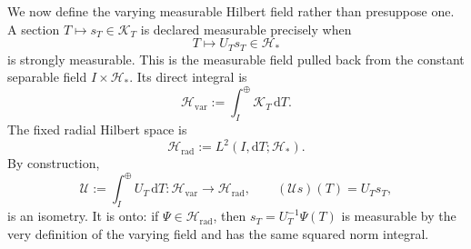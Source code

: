 We now define the varying measurable Hilbert field rather than presuppose
one.  A section \(T\mapsto s_T\in\mathscr K_T\) is declared measurable
precisely when
\[
 T\longmapsto U_Ts_T\in\mathscr H_*
\]
is strongly measurable.  This is the measurable field pulled back from the
constant separable field \(I\times\mathscr H_*\).  Its direct integral is
\[
 \mathscr H_{\mathrm{var}}
 :=\int_I^\oplus\mathscr K_T\,\mathrm d T.
\]
The fixed radial Hilbert space is
\[
 \mathscr H_{\mathrm{rad}}
 :=L^2(I,\mathrm d T;\mathscr H_*).
\]
By construction,
\begin{equation}
 \mathscr U:=\int_I^\oplus U_T\,\mathrm d T:
 \mathscr H_{\mathrm{var}}\longrightarrow\mathscr H_{\mathrm{rad}},
 \qquad
 (\mathscr Us)(T)=U_Ts_T,
\label{native-di-direct-integral-unitary}
\end{equation}
is an isometry.  It is onto: if
\(\Psi\in\mathscr H_{\mathrm{rad}}\), then
\(s_T=U_T^{-1}\Psi(T)\) is measurable by the very definition of the
varying field and has the same squared norm integral.

